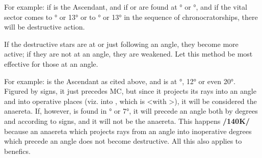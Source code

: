 For example: if \Aries\xspace is the Ascendant, and if \Saturn\xspace or \Mars\xspace are found at \Taurus\xspace 15° or \Gemini\xspace 15°, and if the vital sector comes to \Taurus\xspace 12° or 13° or to \Gemini\xspace 12° or 13° in
the sequence of chronocratorships, there will be destructive action.

If the destructive stars are at or just following an angle, they become more active; if they are not at an angle, they are weakened. Let this method be most effective for those at an angle. 

For example: \Aries\xspace is the Ascendant as cited above, and \Saturn\xspace is at \Sagittarius\xspace 13°, 12° or even 20°. Figured by signs, it just precedes MC, but since it projects its rays into an angle and into operative places (viz. into \Aries, which is \Trine\xspace <with \Sagittarius>), it will be considered the anaereta. If, however, \Saturn\xspace is found in \Sagittarius\xspace 3° or 7°, it will precede an angle both by degrees and according to signs, and it will not be the anaereta. This happens \textbf{/140K/} because an anaereta which projects rays from an angle into inoperative degrees which precede an angle does not become destructive. All this also applies to benefics.

\newpage
